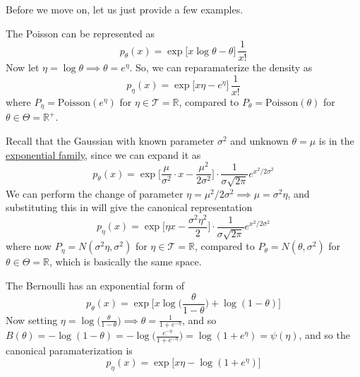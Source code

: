     Before we move on, let us just provide a few examples. 

    \begin{example}[Poisson]
      \label{ex:poisson-2}
    The Poisson can be represented as 
    \begin{equation}
      p_\theta (x) = \exp \big[ x \log{\theta} - \theta \big] \, \frac{1}{x!}
    \end{equation}
    Now let $\eta = \log{\theta} \implies \theta = e^{\eta}$. So, we can reparamaterize the density as 
    \begin{equation}
      p_\eta(x) = \exp \big[ x \eta - e^\eta \big] \, \frac{1}{x!}
    \end{equation}
    where $P_\eta = \mathrm{Poisson}(e^\eta)$ for $\eta \in \mathcal{T} = \mathbb{R}$, compared to $P_\theta = \mathrm{Poisson}(\theta)$ for $\theta \in \Theta = \mathbb{R}^+$. 
    \end{example}

    \begin{example}[Gaussian]
      \label{ex:gaussian-2}
    Recall that the Gaussian with known parameter $\sigma^2$ and unknown $\theta = \mu$ is in the \hyperref[def:exponential-family]{exponential family}, since we can expand it as 
    \begin{equation}
      p_\theta (x) = \exp \bigg[ \frac{\mu}{\sigma^2} \cdot x - \frac{\mu^2}{2 \sigma^2} \bigg] \cdot \frac{1}{\sigma \sqrt{2\pi}} e^{x^2/2 \sigma^2}
    \end{equation}
    We can perform the change of parameter $\eta = \mu^2 / 2\sigma^2 \implies \mu = \sigma^2 \eta$, and substituting this in will give the canonical representation 
    \begin{equation}
      p_\eta (x) = \exp \Big[ \eta x - \frac{\sigma^2 \eta^2}{2} \Big] \cdot \frac{1}{\sigma \sqrt{2\pi}} e^{x^2/2 \sigma^2}
    \end{equation}
    where now $P_\eta = N(\sigma^2 \eta, \sigma^2)$ for $\eta \in \mathcal{T} = \mathbb{R}$, compared to $P_\theta = N(\theta, \sigma^2)$ for $\theta \in \Theta = \mathbb{R}$, which is basically the same space. 
    \end{example}

    \begin{example}[Bernoulli]
      \label{ex:bernoulli-2}
    The Bernoulli has an exponential form of 
    \begin{equation}
      p_\theta (x) = \exp \bigg[ x \log \Big( \frac{\theta}{1 - \theta} \Big) + \log(1 - \theta)\bigg]
    \end{equation}
    Now setting $\eta = \log\big( \frac{\theta}{1 - \theta} \big) \implies \theta = \frac{1}{1 + e^{-\eta}}$, and so $B(\theta) = - \log(1 - \theta) = - \log \big( \frac{e^{-\eta}}{1 + e^{-\eta}} \big) = \log(1 + e^\eta) = \psi(\eta)$, and so the canonical paramaterization is 
    \begin{equation}
      p_\eta (x) = \exp \big[ x \eta - \log(1 + e^{\eta}) \big]
    \end{equation}
    \end{example}


